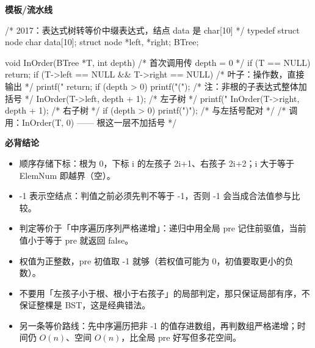 \documentclass[10pt,a4paper]{ctexart}
\begin{document}
\textbf{模板/流水线}

\begin{codebox}
/* 2017：表达式树转等价中缀表达式，结点 data 是 char[10] */
typedef struct node {
    char data[10];
    struct node *left, *right;
} BTree;

void InOrder(BTree *T, int depth) {        /* 首次调用传 depth = 0 */
    if (T == NULL) return;
    if (T->left == NULL && T->right == NULL) {   /* 叶子：操作数，直接输出 */
        printf("%
        return;
    }
    if (depth > 0) printf("(");                  /* 注：非根的子表达式整体加括号 */
    InOrder(T->left, depth + 1);                 /* 左子树 */
    printf("%
    InOrder(T->right, depth + 1);                /* 右子树 */
    if (depth > 0) printf(")");                  /* 与左括号配对 */
}
/* 调用：InOrder(T, 0) —— 根这一层不加括号 */
\end{codebox}





\textbf{必背结论}

\begin{itemize}

\item 顺序存储下标：根为 0，下标 i 的左孩子 2i+1、右孩子 2i+2；i 大于等于 ElemNum 即越界（空）。

\item -1 表示空结点：判值之前必须先判不等于 -1，否则 -1 会当成合法值参与比较。

\item 判定等价于「中序遍历序列严格递增」：递归中用全局 pre 记住前驱值，当前值小于等于 pre 就返回 false。

\item 权值为正整数，pre 初值取 -1 就够（若权值可能为 0，初值要取更小的负数）。

\item 不要用「左孩子小于根、根小于右孩子」的局部判定，那只保证局部有序，不保证整棵是 BST，这是经典错法。

\item 另一条等价路线：先中序遍历把非 -1 的值存进数组，再判数组严格递增；时间仍 $O(n)$、空间 $O(n)$，比全局 pre 好写但多花空间。

\end{itemize}
\end{document}
